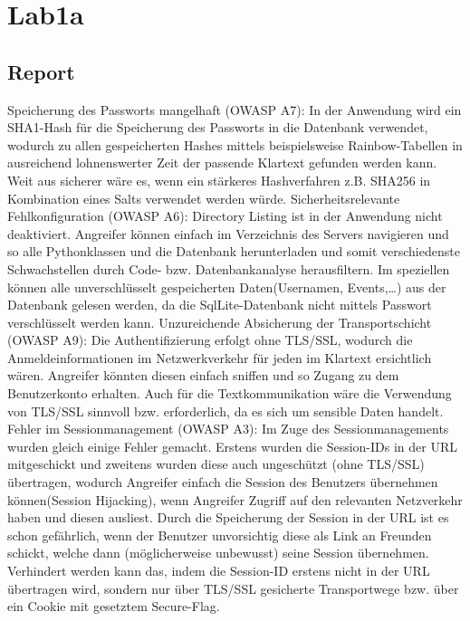\documentclass[12pt,a4paper,titlepage,oneside]{scrartcl}
\begin{document}
\maketitle
\setcounter{section}{0}
\setcounter{tocdepth}{2}
\tableofcontents

%
%

\section{Lab1a}

\subsection{Report}
Speicherung des Passworts mangelhaft (OWASP A7): 
In der Anwendung wird ein SHA1-Hash für die Speicherung des Passworts in die Datenbank verwendet, wodurch zu allen gespeicherten Hashes mittels beispielsweise Rainbow-Tabellen in ausreichend lohnenswerter Zeit der passende Klartext gefunden werden kann. Weit aus sicherer wäre es, wenn ein stärkeres Hashverfahren z.B. SHA256 in Kombination eines Salts verwendet werden würde.
\newline
\newline
Sicherheitsrelevante Fehlkonfiguration (OWASP A6):
Directory Listing ist in der Anwendung nicht deaktiviert. Angreifer können einfach im Verzeichnis des Servers navigieren und so alle Pythonklassen und die Datenbank herunterladen und somit verschiedenste Schwachstellen durch Code- bzw. Datenbankanalyse herausfiltern. Im speziellen können alle unverschlüsselt gespeicherten Daten(Usernamen, Events,…) aus der Datenbank gelesen werden, da die SqlLite-Datenbank nicht mittels Passwort verschlüsselt werden kann. 
\newline
\newline
Unzureichende Absicherung der Transportschicht (OWASP A9): 
Die Authentifizierung erfolgt ohne TLS/SSL, wodurch die Anmeldeinformationen im Netzwerkverkehr für jeden im Klartext ersichtlich wären. Angreifer könnten diesen einfach sniffen und so Zugang zu dem Benutzerkonto erhalten. Auch für die Textkommunikation wäre die Verwendung von TLS/SSL sinnvoll bzw. erforderlich, da es sich um sensible Daten handelt.
\newline
\newline
Fehler im Sessionmanagement (OWASP A3): 
Im Zuge des Sessionmanagements wurden gleich einige Fehler gemacht. Erstens wurden die Session-IDs in der URL mitgeschickt und zweitens wurden diese auch ungeschützt (ohne TLS/SSL) übertragen, wodurch Angreifer einfach die Session des Benutzers übernehmen können(Session Hijacking), wenn Angreifer Zugriff auf den relevanten Netzverkehr haben und diesen ausliest. Durch die Speicherung der Session in der URL ist es schon gefährlich, wenn der Benutzer unvorsichtig diese als Link an Freunden schickt, welche dann (möglicherweise unbewusst) seine Session übernehmen. Verhindert werden kann das, indem die Session-ID erstens nicht in der URL übertragen wird, sondern nur über TLS/SSL gesicherte Transportwege bzw. über ein Cookie mit gesetztem Secure-Flag. 
\end{document}
